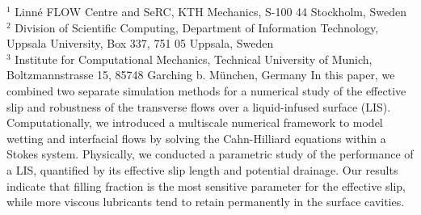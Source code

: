 %
%
%
%
%
%
%
\paperaffiliation
{%
  $^1$ Linn\'e FLOW Centre and SeRC, KTH Mechanics, S-100 44 Stockholm, Sweden\\%
  $^2$ Division of Scientific Computing, Department of Information Technology, \\Uppsala University, Box 337, 751 05 Uppsala, Sweden\\%
  $^3$ Institute for Computational Mechanics, Technical University of Munich, Boltzmannstrasse 15, 85748 Garching b. München, Germany%
}%
%
%
%
%
%
%
%
\paperpages{}%
%
%
%
\papersummary%
{%
   In this paper, we combined two separate simulation methods for a numerical study of the effective slip and robustness of the transverse flows over a liquid-infused surface (LIS). Computationally, we introduced a multiscale numerical framework to model wetting and interfacial flows by solving the Cahn-Hilliard equations within a Stokes system. Physically, we conducted a parametric study of the performance of a LIS, quantified by its effective slip length and potential drainage. Our results indicate that filling fraction is the most sensitive parameter for the effective slip, while more viscous lubricants tend to retain permanently in the surface cavities.
}%
%
\graphicspath{{paper6/}}%
%
%
%
